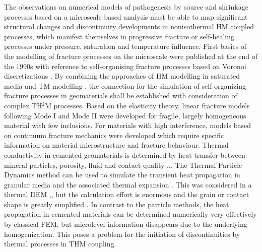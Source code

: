 The observations on numerical models of pathogenesis by source and shrinkage processes based on a microscale based analysis must be able to map significant structural changes and discontinuity developments in nonisothermal HM coupled processes, which manifest themselves in progressive fracture or self-healing processes under pressure, saturation and temperature influence. First basics of the modelling of fracture processes on the microscale were published at the end of the 1990s with reference to self-organising fracture processes based on Voronoi discretizations \cite{BolanderJr.1998569}. By combining the approaches of HM modelling in saturated media \cite{Asahina201413} and TM modelling \cite{Rizvietal2016}, the connection for the simulation of self-organizing fracture processes in geomaterials shall be established with consideration of complex TH$^2$M processes. Based on the elasticity theory, linear fracture models following Mode I and Mode II were developed for fragile, largely homogeneous material with few inclusions. For materials with high interference, models based on continuum fracture mechanics \cite{Talreja1991165} were developed which require specific information on material microstructure and fracture behaviour. Thermal conductivity in cemented geomaterials is determined by heat transfer between mineral particles, porosity, fluid and contact quality 
\cite{Woodside19611688},\cite{Bahrami20063691},\cite{Widenfeld200315}.
The Thermal Particle Dynamics method can be used to simulate the transient heat propagation in granular media and the associated thermal expansion \cite{Vargas20011052}. This was considered in a thermal DEM \cite{Vargas20023119},\cite{Vargas2007}, but the calculation effort is enormous and the grain or contact shape is greatly simplified \cite{Zhang2011172}. In contrast to the particle methods, the heat propagation in cemented materials can be determined numerically very effectively by classical FEM, but microlevel information disappears due to the underlying homogenization. This poses a problem for the initiation of discontinuities by thermal processes in THM coupling. 

